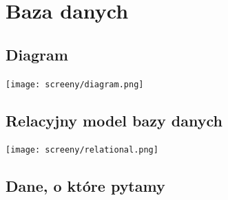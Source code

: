 \documentclass[12pt, titlepage]{article}
\begin{document}
\section{Baza danych}

\subsection{Diagram}
\begin{center}
\hspace{-2cm} \texttt{[image: screeny/diagram.png]}
\end{center}


\subsection{Relacyjny model bazy danych}
\begin{center}
\hspace{-2cm} \texttt{[image: screeny/relational.png]}
\end{center}

\subsection{Dane, o które pytamy}
\end{document}
